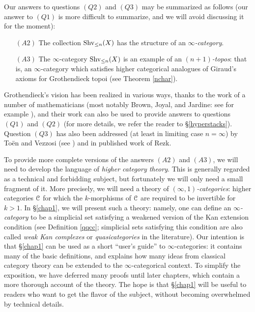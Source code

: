Our answers to questions $(Q2)$ and $(Q3)$ may be summarized as follows
(our answer to $(Q1)$ is more difficult to summarize, and we will avoid discussing it for the moment):

\begin{itemize}
\item[$(A2)$] The collection $\operatorname{Shv}_{\leq n}(X)$ has the structure of an
{\it $\infty$-category}.
\item[$(A3)$] The $\infty$-category $\operatorname{Shv}_{\leq n}(X)$ is an example of
an {\it $(n+1)$-topos}: that is, an $\infty$-category which satisfies
higher categorical analogues of Giraud's axioms for Grothendieck topoi
(see Theorem \ref{nchar}).
\end{itemize}

\begin{remark2}
Grothendieck's vision has been realized in various ways, thanks to the work of a number of mathematicians (most notably Brown, Joyal, and Jardine: see for example \cite{jardine}), and their work can also be used to provide answers to questions $(Q1)$ and $(Q2)$ (for more details, we refer the reader to \S \ref{hyperstacks}). Question $(Q3)$ has also been addressed (at least in limiting case $n = \infty$) by To\"{e}n and Vezzosi (see \cite{toen}) and in published work of Rezk. 
\end{remark2}

To provide more complete versions of the answers $(A2)$ and $(A3)$, we will need to develop the language of {\em higher category theory}. This is generally regarded as a technical and forbidding subject, but fortunately we will only need a small fragment of it. More precisely, we will need a theory of
{\it $(\infty,1)$-categories}: higher categories $\operatorname{\mathcal{C}}$ for which the $k$-morphisms of $\operatorname{\mathcal{C}}$ are required to be invertible for $k > 1$. In \S \ref{chap1}, we will present such a theory:
namely, one can define an {\it $\infty$-category} to be a simplicial set
satisfying a weakened version of the Kan extension condition (see Definition \ref{qqcc}; simplicial sets satisfying this condition are also called {\it weak Kan complexes} or {\it quasicategories} in the literature). 
Our intention is that \S \ref{chap1} can be used as a short ``user's guide'' to $\infty$-categories:
it contains many of the basic definitions, and explains how many ideas from classical category theory can be extended to the $\infty$-categorical context. To simplify the exposition, we have deferred many proofs until later chapters, which contain a more thorough account of the theory.
The hope is that \S \ref{chap1} will be useful to readers who want to get the flavor of the subject, without becoming overwhelmed by technical details.

